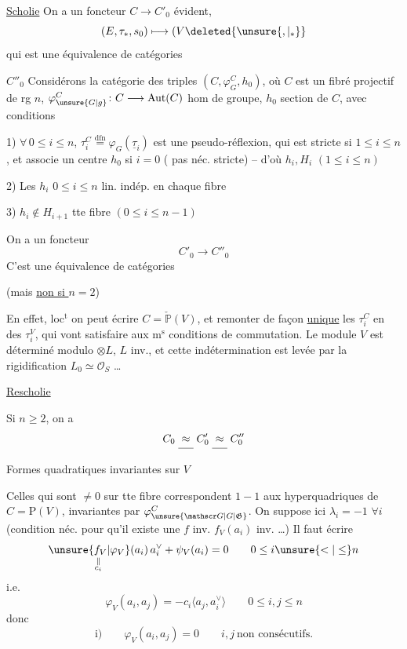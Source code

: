\uline{Scholie} On a un foncteur $C\longrightarrow C'_0$ évident,
\[
(E,\tau_*,s_0)\longmapsto(V\deleted{\unsure{,|_{*}}}
\]
qui est une équivalence de catégories

$\boxed{C''_0}$  Considérons la catégorie des   triples  $(C,\varphi_G^C,h_0)$, où $C$ est un fibré projectif de rg $n$, $\varphi_{\unsure{G|g}}^{C}\colon{C}\longrightarrow\mathrm{Aut}(C)$ hom de groupe, $h_0$ section de $C$, avec conditions

1) $\forall\,0\leq i\leq n$, $\tau_i^C\overset{\mathrm{dfn}}=\varphi_G(\underline{\tau}_i)$ est une pseudo-réflexion, qui est stricte si $1\leq i\leq n$, et associe un centre $h_0$ si $i=0$ ( pas néc. stricte) -- d'où $h_i,H_i$ $(1\leq i\leq n)$

2) Les $h_i$ $0\leq i\leq n$ lin. indép. en chaque fibre

3) $h_i\notin H_{i+1}$  tte fibre $(0\leq i\leq n-1)$

On a un foncteur
\[
C'_0\longrightarrow C''_0
\]
C'est une équivalence de catégories 

(mais \uline{non si $n=2$})

En effet, loc$^{\mathrm t}$ on peut écrire $C=\check{\mathbb P}(V)$, et remonter de façon \uline{unique} les  $\tau_i^C$ en des  $\tau_i^V$, qui vont satisfaire aux m$^{\mathrm s}$ conditions de commutation.  Le module $V$ est déterminé modulo $\otimes L$, $L$ inv., et cette indétermination est levée par la rigidification $L_0\simeq\mathcal O_S$ \ldots

 \uline{Rescholie}

 Si $n\geq2$, on a 
\[
C_0\mathrel{\underset{\rule{1.4em}{.35pt}}{\approx}}C'_0\mathrel{\underset{\rule{1.4em}{.35pt}}{\approx}}C''_0
\]

Formes quadratiques  invariantes sur $V$

  Celles qui sont $\ne0$ sur tte fibre correspondent $1-1$ aux hyperquadriques  de $C=\mathrm P(V)$, invariantes par $\varphi_{\unsure{\mathscr G|G|\mathfrak G}}^C$. On suppose ici \uline{$\lambda_i=-1$} $\forall i$  %
(condition néc. pour qu'il existe une $f$  inv.  $f_V(a_i)$ inv. \ldots) Il faut écrire
\[
\underset{\substack{\|\\c_i}}{\unsure{f_V|\varphi_V}(a_i)}\,a_i^\vee+\psi_V(a_i)=0\qquad 0\leq i\unsure{<|\leq}n
\]
i.e.
\[
\varphi_V(a_i,a_j)=-c_i\langle a_j,a_i^\vee\rangle\qquad 0\leq i,j\leq n
\]
donc
\[
\text{i)}\qquad\varphi_V(a_i,a_j)=0\qquad i,j\ \text{non consécutifs.}
\]


